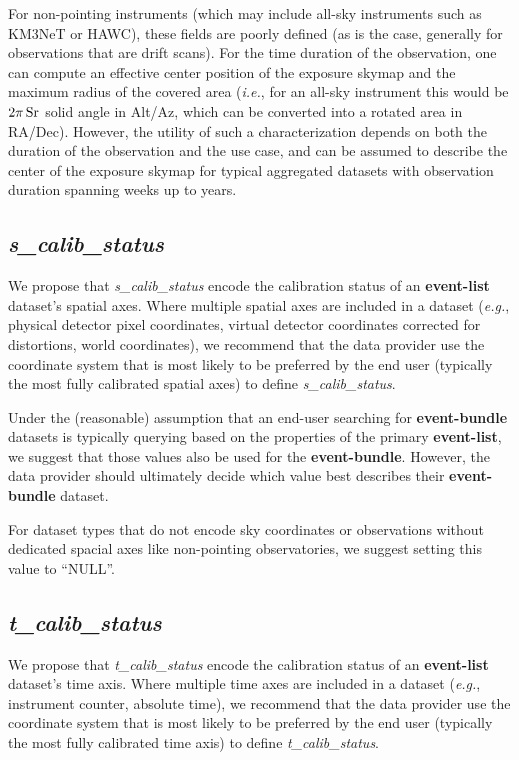 \documentclass[11pt,a4paper]{ivoa}
\begin{document}
For non-pointing instruments (which may include all-sky instruments such as KM3NeT or HAWC), these fields are poorly defined (as is the case, generally for observations that are drift scans).  For the time duration of the observation, one can compute an effective center position of the exposure skymap and the maximum radius of the covered area ({\em i.e.\/}, for an all-sky instrument this would be $2\pi\,\rm Sr$ solid angle in Alt/Az, which can be converted into a rotated area in RA/Dec). However, the utility of such a characterization depends on both the duration of the observation and the use case, and can be assumed to describe the center of the exposure skymap for typical aggregated datasets with observation duration spanning weeks up to years.

\subsection{{\em s\_calib\_status}}

We propose that {\em s\_calib\_status\/} encode the calibration status of an {\bf event-list} dataset's spatial axes. Where multiple spatial axes are included in a dataset ({\em e.g.\/}, physical detector pixel coordinates, virtual detector coordinates corrected for distortions, world coordinates), we recommend that the data provider use the coordinate system that is most likely to be preferred by the end user (typically the most fully calibrated spatial axes) to define {\em s\_calib\_status\/}.

Under the (reasonable) assumption that an end-user searching for {\bf event-bundle} datasets is typically querying based on the properties of the primary {\bf event-list}, we suggest that those values also be used for the {\bf event-bundle}.  However, the data provider should ultimately decide which value best describes their {\bf event-bundle} dataset.

For dataset types that do not encode sky coordinates or observations without dedicated spacial axes like non-pointing observatories, we suggest setting this value to ``NULL''.

\subsection{{\em t\_calib\_status}}

We propose that {\em t\_calib\_status\/} encode the calibration status of an {\bf event-list} dataset's time axis.  Where multiple time axes are included in a dataset ({\em e.g.\/}, instrument counter, absolute time), we recommend that the data provider use the coordinate system that is most likely to be preferred by the end user (typically the most fully calibrated time axis) to define {\em t\_calib\_sta\-tus\/}.
\end{document}
